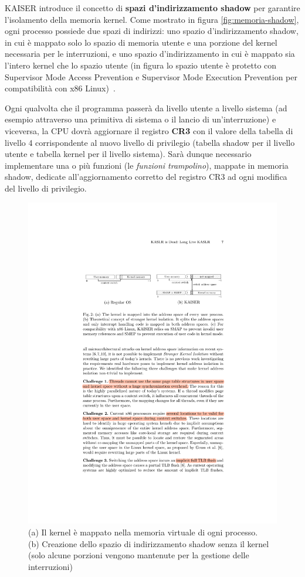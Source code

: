 KAISER introduce il concetto di \textbf{spazi d'indirizzamento shadow} per garantire l'isolamento della memoria kernel. 
Come mostrato in figura \vref{fig:memoria-shadow}, ogni processo possiede due spazi di indirizzi: uno spazio d'indirizzamento shadow, in cui è mappato solo lo spazio di memoria utente e una porzione del kernel necessaria per le interruzioni, e uno spazio d'indirizzamento in cui è mappato sia l'intero kernel che lo spazio utente (in figura lo spazio utente è protetto con Supervisor Mode Access Prevention e Supervisor Mode Execution Prevention per compatibilità con x86 Linux)~\cite{gruss:kaslr}.

Ogni qualvolta che il programma passerà da livello utente a livello sistema (ad esempio attraverso una primitiva di sistema o il lancio di un'interruzione) e viceversa, la CPU dovrà aggiornare il registro \textbf{CR3} con il valore della tabella di livello 4 corrispondente al nuovo livello di privilegio (tabella shadow per il livello utente e tabella kernel per il livello sistema). 
Sarà dunque necessario implementare una o più funzioni (le \emph{funzioni trampolino}), mappate in memoria shadow, dedicate all'aggiornamento corretto del registro CR3 ad ogni modifica del livello di privilegio.

\begin{figure}
	\centering
	\includegraphics[width=\textwidth]{"img/memoria-shadow.pdf"}
	\caption{(a) Il kernel è mappato nella memoria virtuale di ogni processo.\\(b) Creazione dello spazio di indirizzamento shadow senza il kernel (solo alcune porzioni vengono mantenute per la gestione delle interruzioni)}
	\label{fig:memoria-shadow}
\end{figure}


